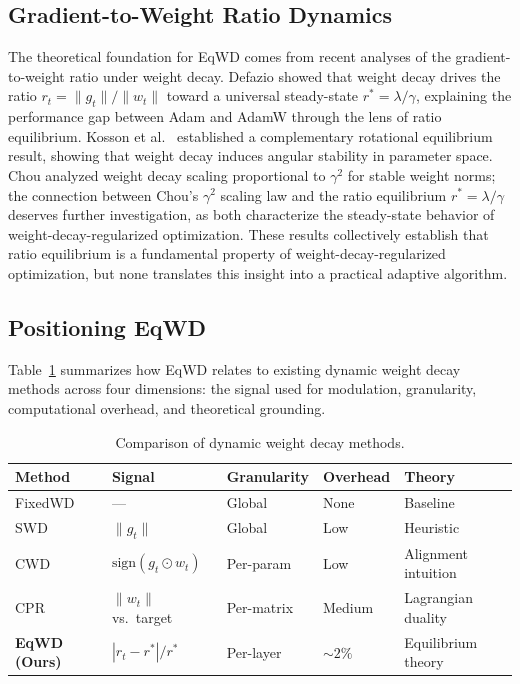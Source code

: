 \documentclass{article}
\begin{document}
\subsection{Gradient-to-Weight Ratio Dynamics}
\label{sec:related_ratio}

The theoretical foundation for EqWD comes from recent analyses of the
gradient-to-weight ratio under weight decay. Defazio \citep{defazio2025}
showed that weight decay drives the ratio $r_t = \|g_t\| / \|w_t\|$
toward a universal steady-state $r^* = \lambda / \gamma$, explaining
the performance gap between Adam and AdamW through the lens of ratio
equilibrium. Kosson et al.~\citep{kosson2023} established a complementary
rotational equilibrium result, showing that weight decay induces angular
stability in parameter space. Chou \citep{chou2025} analyzed weight decay
scaling proportional to $\gamma^2$ for stable weight norms; the
connection between Chou's $\gamma^2$ scaling law and the ratio
equilibrium $r^* = \lambda/\gamma$ deserves further investigation, as
both characterize the steady-state behavior of weight-decay-regularized
optimization. These results collectively establish that ratio
equilibrium is a fundamental property of weight-decay-regularized
optimization, but none translates this insight into a practical adaptive
algorithm.

\subsection{Positioning EqWD}
\label{sec:related_positioning}

Table~\ref{tab:method_comparison} summarizes how EqWD
relates to existing dynamic weight decay methods across four dimensions:
the signal used for modulation, granularity, computational overhead, and
theoretical grounding.

\begin{table}[t]
\centering
\caption{Comparison of dynamic weight decay methods.}
\label{tab:method_comparison}
\small
\begin{tabular}{lllll}
\toprule
Method & Signal & Granularity & Overhead & Theory \\
\midrule
FixedWD & --- & Global & None & Baseline \\
SWD \citep{xie2023swd} & $\|g_t\|$ & Global & Low & Heuristic \\
CWD \citep{chen2026cwd} & $\text{sign}(g_t \odot w_t)$ & Per-param & Low & Alignment intuition \\
CPR \citep{franke2024cpr} & $\|w_t\|$ vs.\ target & Per-matrix & Medium & Lagrangian duality \\
\textbf{EqWD (Ours)} & $|r_t - r^*| / r^*$ & Per-layer & ${\sim}2\%$ & Equilibrium theory \\
\bottomrule
\end{tabular}
\end{table}
\end{document}
